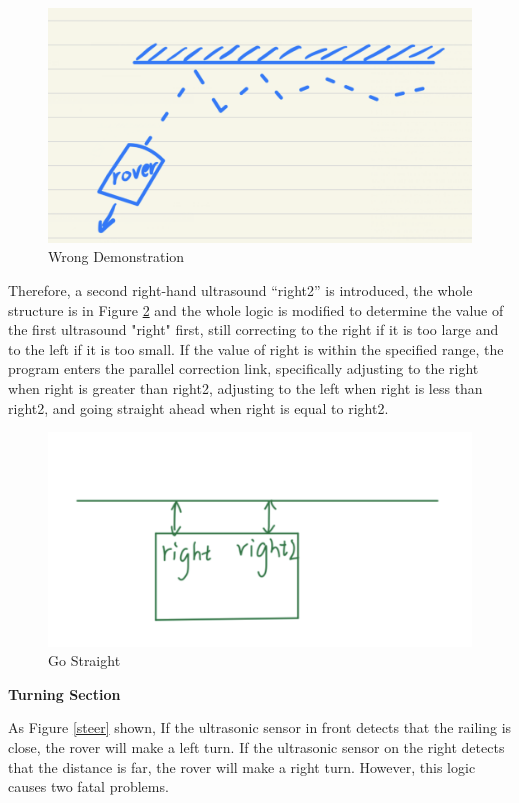 \documentclass[12pt, a4paper, oneside]{report}
\begin{document}
\begin{figure}[H]
    \centering
    \includegraphics[scale=0.2]{pic/Patio 2/Fig6.png}
    \caption{Wrong Demonstration}
    \label{wd}
\end{figure}

Therefore, a second right-hand ultrasound “right2” is introduced, the whole structure is in Figure \ref{gostr} and the whole logic is modified to determine the value of the first ultrasound "right" first, still correcting to the right if it is too large and to the left if it is too small. If the value of right is within the specified range, the program enters the parallel correction link, specifically adjusting to the right when right is greater than right2, adjusting to the left when right is less than right2, and going straight ahead when right is equal to right2.

\begin{figure}[H]
    \centering
    \includegraphics[scale=0.53]{pic/Patio 2/Fig7.png}
    \caption{Go Straight}
    \label{gostr}
\end{figure}

\newpage
\textbf{Turning Section}

As Figure \ref{steer} shown, If the ultrasonic sensor in front detects that the railing is close, the rover will make a left turn. If the ultrasonic sensor on the right detects that the distance is far, the rover will make a right turn. However, this logic causes two fatal problems.
\end{document}
